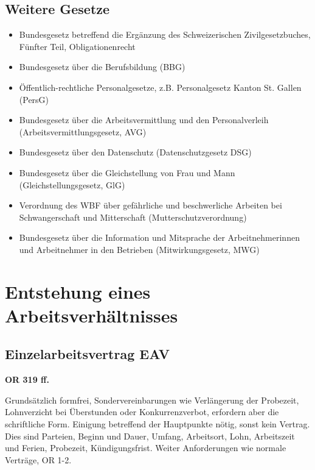 \subsection{Weitere Gesetze}
\begin{itemize} 
  \item Bundesgesetz betreffend die Ergänzung des Schweizerischen Zivilgesetzbuches, Fünfter Teil, Obligationenrecht
  \item Bundesgesetz über die Berufsbildung (BBG)
  \item Öffentlich-rechtliche Personalgesetze, z.B. Personalgesetz Kanton St. Gallen (PersG)
  \item Bundesgesetz über die Arbeitsvermittlung und den Personalverleih (Arbeitsvermittlungsgesetz, AVG)
  \item Bundesgesetz über den Datenschutz (Datenschutzgesetz DSG)
  \item Bundesgesetz über die Gleichstellung von Frau und Mann (Gleichstellungsgesetz, GlG)
  \item Verordnung des WBF über gefährliche und beschwerliche Arbeiten bei Schwangerschaft und Mitterschaft (Mutterschutzverordnung)
  \item Bundesgesetz über die Information und Mitsprache der Arbeitnehmerinnen und Arbeitnehmer in den Betrieben (Mitwirkungsgesetz, MWG)
\end{itemize}

\section{Entstehung eines Arbeitsverhältnisses}

\subsection{Einzelarbeitsvertrag EAV}
\textbf{OR 319 ff.}

Grundsätzlich formfrei, Sondervereinbarungen wie Verlängerung der Probezeit, Lohnverzicht bei
Überstunden oder Konkurrenzverbot, erfordern aber die schriftliche Form. 
Einigung betreffend der Hauptpunkte nötig, sonst kein Vertrag. Dies sind Parteien, Beginn und Dauer, Umfang, Arbeitsort, Lohn, Arbeitszeit und Ferien, Probezeit, Kündigungsfrist.
Weiter Anforderungen wie normale Verträge, OR 1-2.

